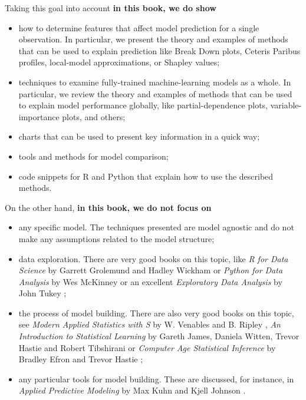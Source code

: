 \documentclass[12pt,]{krantz}
\providecommand{\tightlist}{%
  \setlength{\itemsep}{0pt}\setlength{\parskip}{0pt}}
\begin{document}
Taking this goal into account \textbf{in this book, we do show}

\begin{itemize}
\tightlist
\item
  how to determine features that affect model prediction for a single observation. In particular, we present the theory and examples of methods that can be used to explain prediction like Break Down plots, Ceteris Paribus profiles, local-model approximations, or Shapley values;
\item
  techniques to examine fully-trained machine-learning models as a whole. In particular, we review the theory and examples of methods that can be used to explain model performance globally, like partial-dependence plots, variable-importance plots, and others;
\item
  charts that can be used to present key information in a quick way;
\item
  tools and methods for model comparison;
\item
  code snippets for R and Python that explain how to use the described methods.
\end{itemize}

On the other hand, \textbf{in this book, we do not focus on}

\begin{itemize}
\tightlist
\item
  any specific model. The techniques presented are model agnostic and do not make any assumptions related to the model structure;
\item
  data exploration. There are very good books on this topic, like \emph{R for Data Science} by Garrett Grolemund and Hadley Wickham \citep{r4ds2019} or \emph{Python for Data Analysis} \citep{Wes2012} by Wes McKinney or an excellent \emph{Exploratory Data Analysis} by John Tukey \citep{tukey1977};
\item
  the process of model building. There are also very good books on this topic, see \emph{Modern Applied Statistics with S} by W. Venables and B. Ripley \citep{MASSbook}, \emph{An Introduction to Statistical Learning} by Gareth James, Daniela Witten, Trevor Hastie and Robert Tibshirani \citep{James20147} or \emph{Computer Age Statistical Inference} by Bradley Efron and Trevor Hastie \citep{Efron2016};
\item
  any particular tools for model building. These are discussed, for instance, in \emph{Applied Predictive Modeling} by Max Kuhn and Kjell Johnson \citep{Kuhn2013}.
\end{itemize}
\end{document}
